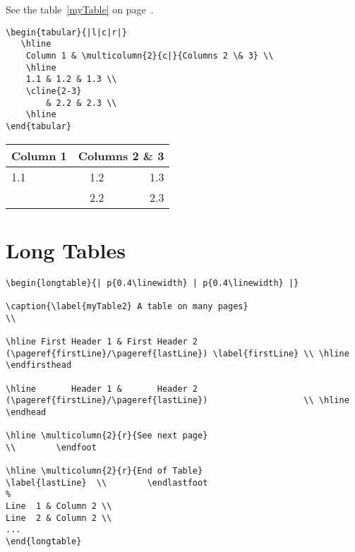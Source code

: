\begin{Results}
\listoftables

See the table~\ref{myTable} on page~\pageref{myTable}.
\end{Results}

\begin{LaTeXsource}
\begin{verbatim}
\begin{tabular}{|l|c|r|} 
   \hline
    Column 1 & \multicolumn{2}{c|}{Columns 2 \& 3} \\
    \hline
    1.1 & 1.2 & 1.3 \\
    \cline{2-3} 
        & 2.2 & 2.3 \\
    \hline
\end{tabular}
\end{verbatim}
\end{LaTeXsource}

\begin{Results}
\begin{tabular}{|l|c|r|} 
   \hline
    Column 1 & \multicolumn{2}{c|}{Columns 2 \& 3} \\
    \hline
    1.1 & 1.2 & 1.3 \\
    \cline{2-3} 
        & 2.2 & 2.3 \\
    \hline
\end{tabular}
\end{Results}

\pagebreak
\section{Long Tables}

\begin{LaTeXsource}
\begin{verbatim}
\begin{longtable}{| p{0.4\linewidth} | p{0.4\linewidth} |}

\caption{\label{myTable2} A table on many pages}                                                  \\

\hline First Header 1 & First Header 2 (\pageref{firstLine}/\pageref{lastLine}) \label{firstLine} \\ \hline \endfirsthead

\hline       Header 1 &       Header 2 (\pageref{firstLine}/\pageref{lastLine})                   \\ \hline \endhead

\hline \multicolumn{2}{r}{See next page}                                                          \\        \endfoot

\hline \multicolumn{2}{r}{End of Table}                                         \label{lastLine}  \\        \endlastfoot
%
Line  1 & Column 2 \\
Line  2 & Column 2 \\
...
\end{longtable}
\end{verbatim}
\end{LaTeXsource}

